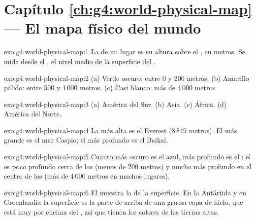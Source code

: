\section*{Capítulo \ref{ch:g4:world-physical-map} --- El mapa físico del mundo}

\begin{solution}{exo:g4:world-physical-map:1}
La  de un lugar es su altura sobre el , en metros. Se
mide desde el , el nivel medio de la superficie del .
\end{solution}

\begin{solution}{exo:g4:world-physical-map:2}
(a) Verde oscuro: entre 0 y 200 metros. (b) Amarillo pálido: entre 500 y
1\,000 metros. (c) Casi blanco: más de 4\,000 metros.
\end{solution}

\begin{solution}{exo:g4:world-physical-map:3}
(a) América del Sur. (b) Asia. (c) África. (d) América del Norte.
\end{solution}

\begin{solution}{exo:g4:world-physical-map:4}
La  más alta es el Everest (8\,849 metros). El  más grande es el
mar Caspio; el  más profundo es el  Baikal.
\end{solution}

\begin{solution}{exo:g4:world-physical-map:5}
Cuanto más oscuro es el azul, más profundo es el : el  es poco
profundo cerca de las  (menos de 200 metros) y mucho más profundo en
el centro de los  (más de 4\,000 metros en muchos lugares).
\end{solution}

\begin{solution}{exo:g4:world-physical-map:6}
El  muestra la  de la superficie. En la Antártida y en
Groenlandia la superficie es la parte de arriba de una gruesa capa de
hielo, que está muy por encima del , así que tienen los
colores de las tierras altas.
\end{solution}

